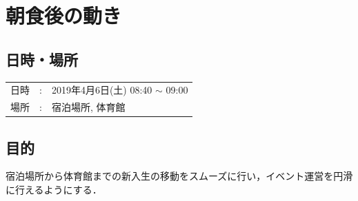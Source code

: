 %

\section{朝食後の動き}


\subsection{日時・場所}
\begin{tabular}{p{}rp{}}
  日時 & : & 2019年4月6日(土) 08:40 $\sim$ 09:00\\
  場所 & : & 宿泊場所, 体育館
\end{tabular}

\subsection{目的}
宿泊場所から体育館までの新入生の移動をスムーズに行い，イベント運営を円滑に行えるようにする．

